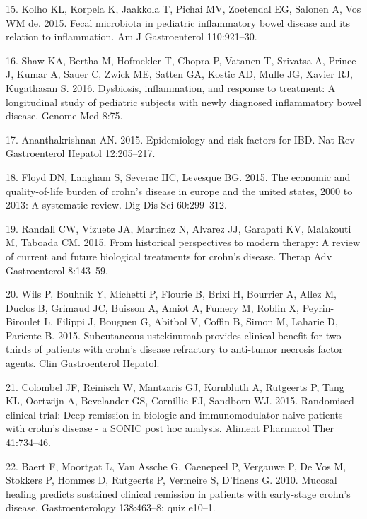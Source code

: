 \documentclass[12pt,]{article}
\begin{document}
\hypertarget{ref-Kolho2015_pedIBD}{}
15. Kolho KL, Korpela K, Jaakkola T, Pichai MV, Zoetendal EG, Salonen A,
Vos WM de. 2015. Fecal microbiota in pediatric inflammatory bowel
disease and its relation to inflammation. Am J Gastroenterol
110:921--30.

\hypertarget{ref-Shaw_response_2016}{}
16. Shaw KA, Bertha M, Hofmekler T, Chopra P, Vatanen T, Srivatsa A,
Prince J, Kumar A, Sauer C, Zwick ME, Satten GA, Kostic AD, Mulle JG,
Xavier RJ, Kugathasan S. 2016. Dysbiosis, inflammation, and response to
treatment: A longitudinal study of pediatric subjects with newly
diagnosed inflammatory bowel disease. Genome Med 8:75.

\hypertarget{ref-ananthakrishnan_epidemiology_2015}{}
17. Ananthakrishnan AN. 2015. Epidemiology and risk factors for IBD. Nat
Rev Gastroenterol Hepatol 12:205--217.

\hypertarget{ref-floyd_economicburden_2015}{}
18. Floyd DN, Langham S, Severac HC, Levesque BG. 2015. The economic and
quality-of-life burden of crohn's disease in europe and the united
states, 2000 to 2013: A systematic review. Dig Dis Sci 60:299--312.

\hypertarget{ref-randall_CDbiologics_2015}{}
19. Randall CW, Vizuete JA, Martinez N, Alvarez JJ, Garapati KV,
Malakouti M, Taboada CM. 2015. From historical perspectives to modern
therapy: A review of current and future biological treatments for
crohn's disease. Therap Adv Gastroenterol 8:143--59.

\hypertarget{ref-wils_ust_2015}{}
20. Wils P, Bouhnik Y, Michetti P, Flourie B, Brixi H, Bourrier A, Allez
M, Duclos B, Grimaud JC, Buisson A, Amiot A, Fumery M, Roblin X,
Peyrin-Biroulet L, Filippi J, Bouguen G, Abitbol V, Coffin B, Simon M,
Laharie D, Pariente B. 2015. Subcutaneous ustekinumab provides clinical
benefit for two-thirds of patients with crohn's disease refractory to
anti-tumor necrosis factor agents. Clin Gastroenterol Hepatol.

\hypertarget{ref-colombel_deepremission_2015}{}
21. Colombel JF, Reinisch W, Mantzaris GJ, Kornbluth A, Rutgeerts P,
Tang KL, Oortwijn A, Bevelander GS, Cornillie FJ, Sandborn WJ. 2015.
Randomised clinical trial: Deep remission in biologic and
immunomodulator naive patients with crohn's disease - a SONIC post hoc
analysis. Aliment Pharmacol Ther 41:734--46.

\hypertarget{ref-baert_mucosalhealing_2010}{}
22. Baert F, Moortgat L, Van Assche G, Caenepeel P, Vergauwe P, De Vos
M, Stokkers P, Hommes D, Rutgeerts P, Vermeire S, D'Haens G. 2010.
Mucosal healing predicts sustained clinical remission in patients with
early-stage crohn's disease. Gastroenterology 138:463--8; quiz e10--1.
\end{document}
